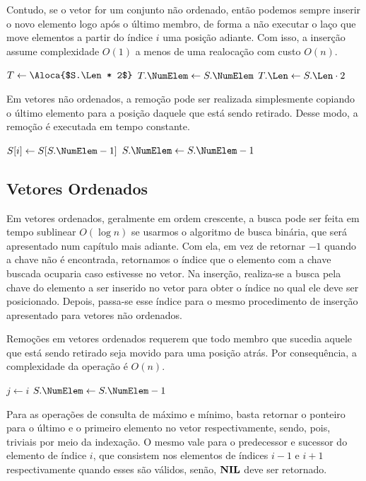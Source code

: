 Contudo, se o vetor for um conjunto não ordenado, então podemos sempre inserir o novo
elemento logo após o último membro, de forma a não executar o laço que move elementos a
partir do índice $i$ uma posição adiante.
Com isso, a inserção assume complexidade $O(1)$ a menos de uma realocação com custo $O(n)$.

\begin{function}
\SetAlgoLined
\caption{Realoca-Vetor($S$)}
    $T \gets \Aloca{$S.\Len * 2$}$\;
    $T.\NumElem \gets S.\NumElem$\;
    $T.\Len \gets S.\Len \cdot 2$\;
    \;
\end{function}


Em vetores não ordenados, a remoção pode ser realizada simplesmente copiando o último
elemento para a posição daquele que está sendo retirado.
Desse modo, a remoção é executada em tempo constante.

\begin{function}[H]
\SetAlgoLined
\caption{Remove-Vetor($S$, $i$)}
$S[i] \gets S[S.\NumElem - 1]$\;
$S.\NumElem \gets S.\NumElem - 1$\;
\end{function}

\subsection{Vetores Ordenados}

Em vetores ordenados, geralmente em ordem crescente, a busca pode ser feita em tempo
sublinear $O(\log n)$ se usarmos o algoritmo de busca binária, que será apresentado num
capítulo mais adiante.
Com ela, em vez de retornar $-1$ quando a chave não é encontrada, retornamos o índice que
o elemento com a chave buscada ocuparia caso estivesse no vetor.
Na inserção, realiza-se a busca pela chave do elemento a ser inserido no vetor para obter
o índice no qual ele deve ser posicionado.
Depois, passa-se esse índice para o mesmo procedimento de inserção apresentado para
vetores não ordenados.

Remoções em vetores ordenados requerem que todo membro que sucedia aquele que está sendo
retirado seja movido para uma posição atrás.
Por consequência, a complexidade da operação é $O(n)$.

\begin{function}[H]
\SetAlgoLined
\caption{Remove-Vetor-Ordenado($S$, $i$)}
$j \gets i$\;
$S.\NumElem \gets S.\NumElem - 1$\;
\end{function}

Para as operações de consulta de máximo e mínimo, basta retornar o ponteiro para o último
e o primeiro elemento no vetor respectivamente, sendo, pois, triviais por meio da indexação.
O mesmo vale para o predecessor e sucessor do elemento de índice $i$, que consistem nos
elementos de índices $i-1$ e $i+1$ respectivamente quando esses são válidos, senão,
$\mathbf{NIL}$ deve ser retornado.
